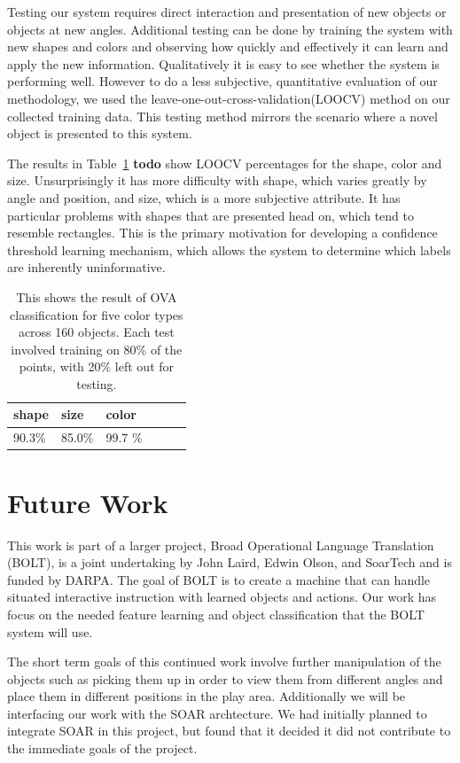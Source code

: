 \documentclass[11pt]{article}
\newcommand{\xxx}[1]{{\bf \color{red} #1}}
\newcommand\T{\rule{0pt}{3ex}}
\newcommand\B{\rule[-1.2ex]{0pt}{0pt}}
\begin{document}
{Testing our system requires direct interaction and presentation of new objects
or objects at new angles.  Additional testing can be done by training the
system with new shapes and colors and observing how quickly and effectively it
can learn and apply the new information.  Qualitatively it is easy to see
whether the system is performing well.  However to do a less subjective,
quantitative evaluation of our methodology, we used the
leave-one-out-cross-validation(LOOCV) method on our collected training data. This
testing method mirrors the scenario where a novel object is presented to this
system.

The results in Table~\ref{tbl:testresults} \xxx{todo} show LOOCV percentages
for the shape, color and size.  Unsurprisingly it has more difficulty with shape,
which varies greatly by angle and position, and size, which is a more
subjective attribute. It has particular problems with shapes that are presented
head on, which tend to resemble rectangles.  This is the primary motivation for
developing a confidence threshold learning mechanism, which allows the system
to determine which labels are inherently uninformative.


\begin{table}
\centering
\begin{tabular}{ | l | l | l | l | l | l |}
    \hline
    shape &  size & color \T \B \\ \hline
    90.3\%  & 85.0\% & 99.7 \% \B \T \\ \hline
\end{tabular}
\caption{This shows the result of OVA classification for five color types
    across 160 objects. Each test involved training on 80\% of the points,
           with 20\% left out for testing.}
\label{tbl:testresults}
\end{table}

\section{Future Work}
This work is part of a larger project, Broad Operational Language Translation
(BOLT), is a joint undertaking by John Laird, Edwin Olson, and SoarTech and is
funded by DARPA. The goal of BOLT is to create a machine that can handle
situated interactive instruction with learned objects and actions. Our work has
focus on the needed feature learning and object classification that the BOLT
system will use.

The short term goals of this continued work involve further manipulation of the
objects such as picking them up in order to view them from different angles and
place them in different positions in the play area. Additionally we will be
interfacing our work with the SOAR archtecture. We had initially planned to
integrate SOAR in this project, but found that it decided it did not contribute
to the immediate goals of the project.

}
\end{document}
